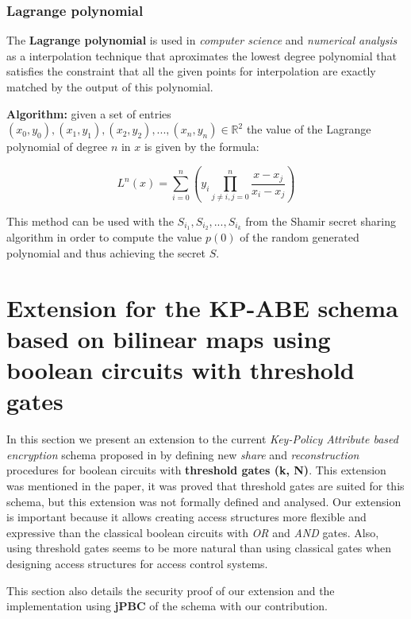 \documentclass[12pt]{article}
\begin{document}
\subsubsection{Lagrange polynomial}

The \textbf{Lagrange polynomial} is used in \textit{computer science} and \textit{numerical analysis} as a interpolation technique that aproximates the lowest degree polynomial that satisfies the constraint that all the given points for interpolation are exactly matched by the output of this polynomial.

\textbf{Algorithm:} given a set of entries $(x_0, y_0),(x_1, y_1), (x_2, y_2), ..., (x_n, y_n) \in \mathbb{R}^2$ the value of the Lagrange polynomial of degree $n$ in $x$ is given by the formula:

$$L^n(x) = \sum_{i = 0}^n(y_i\prod_{j \neq i, j = 0}^n \frac{x - x_j}{x_i - x_j})$$

This method can be used with the $S_{i_1}, S_{i_2}, ..., S_{i_k}$ from the Shamir secret sharing algorithm in order to compute the value $p(0)$ of the random generated polynomial and thus achieving the secret $S$.

\vspace{200mm}

\section{Extension for the KP-ABE schema based on bilinear maps using boolean circuits with threshold gates}

In this section we present an extension to the current \textit{Key-Policy Attribute based encryption} schema proposed in \cite{fltccd} by defining new \textit{share} and \textit{reconstruction} procedures for boolean circuits with \textbf{threshold gates (k, N)}. This extension was mentioned in the \cite{fltccd} paper, it was proved that threshold gates are suited for this schema, but this extension was not formally defined and analysed. Our extension is important because it allows creating access structures more flexible and expressive than the classical boolean circuits with \textit{OR} and \textit{AND} gates. Also, using threshold gates seems to be more natural than using classical gates when designing access structures for access control systems.

This section also details the security proof of our extension and the implementation using \textbf{jPBC} of the \cite{fltccd} schema with our contribution. 
\end{document}
